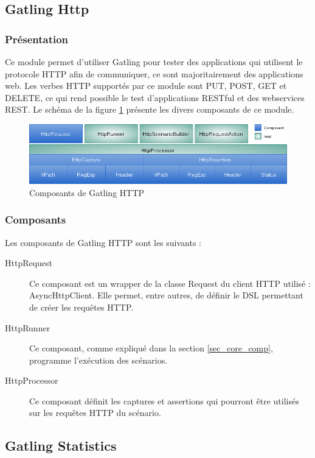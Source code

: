 \subsection{Gatling Http}
\subsubsection{Présentation}
Ce module permet d'utiliser Gatling pour tester des applications qui utilisent le protocole HTTP afin de communiquer, ce sont majoritairement des applications web. Les verbes HTTP supportés par ce module sont PUT, POST, GET et DELETE, ce qui rend possible le test d'applications RESTful et des webservices REST. Le schéma de la figure \ref{gatling_http} présente les divers composants de ce module.

\begin{figure}[h]
\begin{center}
\includegraphics[width=400pt]{img/gatling_http.png}
\end{center}
\caption{Composants de Gatling HTTP}
\label{gatling_http}
\end{figure}

\subsubsection{Composants}
Les composants de Gatling HTTP sont les suivants :
\begin{description}
\item[HttpRequest] Ce composant est un wrapper de la classe Request du client HTTP utilisé : AsyncHttpClient. Elle permet, entre autres, de définir le DSL permettant de créer les requêtes HTTP.
\item[HttpRunner] Ce composant, comme expliqué dans la section \ref{sec_core_comp}, programme l'exécution des scénarios.
\item[HttpProcessor] Ce composant définit les captures et assertions qui pourront être utilisés sur les requêtes HTTP du scénario.
\end{description}

\subsection{Gatling Statistics}
